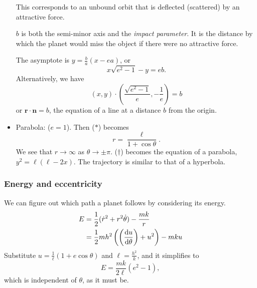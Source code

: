 \documentclass[a4paper]{article}
\begin{document}
\begin{itemize}
    \begin{center}
    \end{center}

    This corresponds to an unbound orbit that is deflected (scattered) by an attractive force.

    $b$ is both the semi-minor axis and the \emph{impact parameter}. It is the distance by which the planet would miss the object if there were no attractive force.

    The asymptote is $y = \frac{b}{a}(x - ea)$, or
    \[
      x \sqrt{e^2 - 1} - y = eb.
    \]
    Alternatively, we have
    \[
      (x, y) \cdot \left(\frac{\sqrt{e^2 - 1}}{e}, -\frac{1}{e}\right) = b
    \]
    or $\mathbf{r} \cdot \mathbf{n} = b$, the equation of a line at a distance $b$ from the origin.

  \item Parabola: ($e = 1$). Then ($*$) becomes
    \[
      r = \frac{\ell}{1 + \cos \theta}.
    \]
    We see that $r\to \infty$ as $\theta \to \pm \pi$. ($\dagger$) becomes the equation of a parabola, $y^2 = \ell(\ell - 2x)$. The trajectory is similar to that of a hyperbola.
\end{itemize}

\subsubsection{Energy and eccentricity}
We can figure out which path a planet follows by considering its energy.
\begin{align*}
  E &= \frac{1}{2}(\dot{r}^2 + r^2\dot{\theta}) - \frac{mk}{r}\\
  &= \frac{1}{2}mh^2\left(\left(\frac{\mathrm{d} u}{\mathrm{d} \theta}\right) + u^2\right) - mku
\end{align*}
Substitute $\displaystyle u = \frac{1}{\ell}(1 + e\cos \theta)$ and $\displaystyle \ell = \frac{h^2}{k}$, and it simplifies to
\[
  E = \frac{mk}{2\ell}(e^2 - 1),
\]
which is independent of $\theta$, as it must be.
\end{document}
